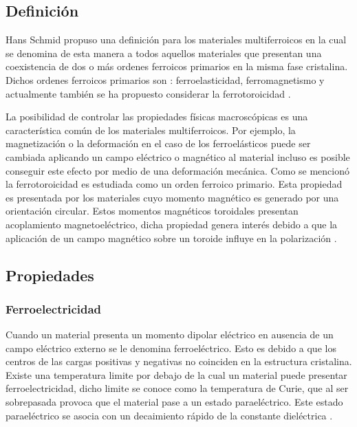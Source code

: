 \subsection{Definici\'on}

Hans Schmid propuso una definici\'on para los materiales multiferroicos en la cual se denomina de esta manera a todos aquellos materiales que presentan una coexistencia de dos o m\'as ordenes ferroicos primarios en la misma fase cristalina. Dichos ordenes ferroicos primarios son : ferroelasticidad, ferromagnetismo y actualmente tambi\'en se ha propuesto considerar la ferrotoroicidad \cite{esrenstein2006}.


\noindent La posibilidad de controlar las propiedades f\'isicas macrosc\'opicas es una caracter\'istica com\'un de los materiales multiferroicos. Por ejemplo, la magnetizaci\'on o la deformaci\'on en el caso de los ferroel\'asticos puede ser cambiada aplicando un campo el\'ectrico o magn\'etico al material incluso es posible conseguir este efecto por medio de una deformaci\'on mec\'anica. Como se mencion\'o la ferrotoroicidad es estudiada como un orden ferroico primario. Esta propiedad es presentada por los materiales cuyo momento magn\'etico es generado por una orientaci\'on circular. Estos momentos magn\'eticos toroidales presentan acoplamiento magnetoel\'ectrico, dicha propiedad genera inter\'es debido a que la aplicaci\'on de un campo magn\'etico sobre un toroide influye en la polarizaci\'on \cite{nazzen1988}.


\subsection{Propiedades}
\subsubsection{Ferroelectricidad}

Cuando un material presenta un momento dipolar el\'ectrico en ausencia de un campo el\'ectrico externo se le denomina ferroel\'ectrico. Esto es debido a que los centros de las cargas positivas y negativas no coinciden en la estructura cristalina. Existe una temperatura limite por debajo de la cual un material puede presentar ferroelectricidad, dicho limite se conoce como la temperatura de Curie, que al ser sobrepasada provoca que el material pase a un estado parael\'ectrico. Este estado parael\'ectrico se asocia con un decaimiento r\'apido de la constante diel\'ectrica \cite{kimura2003}.

